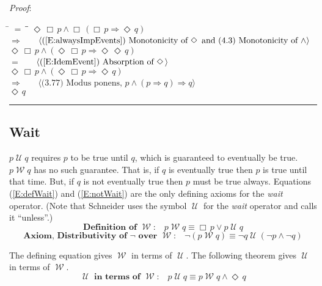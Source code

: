 \documentclass[12pt, fleqn, leqno]{article}
\newcommand{\lgap}{2pt}                             %
\newcommand{\mymathindent}{24pt}                    %
\newcommand{\impl}{\ensuremath{\Rightarrow}}        %
\newcommand{\Until}{\;\mathcal{U}\;}
\newcommand{\Wait}{\;\mathcal{W}\;}
\newcommand{\Event}{\Diamond\,}
\newcommand{\Always}{\Box\,}
\newcommand{\myqed}{\rule[-.23ex]{1.2ex}{2.0ex}}
\newcommand{\myqedtab}{\hspace{384pt}}              %
\newcommand{\Gll} {\langle}                         %
\newcommand{\Ggg} {\rangle}                         %
\newcommand{\Hint}[1]     {\ \ \ $\Gll              \mbox{#1} \Ggg$ }   %
\begin{document}
\emph{Proof}:
\begin{tabbing}
\hspace{\mymathindent} \= $= \;$ \= \myqedtab \= \kill
\> \>   $\Event\Always p \land \Always(\Always p \impl \Event q)$\\[\lgap]
\> $\impl$  \>  \Hint{(\ref{E:alwaysImpEvents}) Monotonicity of $\Event$ and (4.3) Monotonicity of $\land$}\\[\lgap]
\> \>   $\Event\Always p \land (\Event\Always p \impl \Event\Event q)$\\[\lgap]
\> $=$  \>  \Hint{(\ref{E:IdemEvent}) Absorption of $\Event$}\\[\lgap]
\> \>   $\Event\Always p \land (\Event\Always p \impl \Event q)$\\[\lgap]
\> $\impl$  \>  \Hint{(3.77) Modus ponens, $p\land (p\impl q)\impl q$}\\[\lgap]
\> \>   $\Event q$ \quad \myqed
\end{tabbing}

\subsection{Wait}\label{section-wait}

$p\Until q$ requires $p$ to be true until $q$, which is guaranteed to eventually be true.
$p\Wait q$ has no such guarantee.
That is, if $q$ is eventually true then $p$ is true until that time.
But, if $q$ is not eventually true then $p$ must be true always.
Equations (\ref{E:defWait}) and (\ref{E:notWait}) are the only defining axioms for the \textit{wait} operator.
(Note that Schneider \cite{Schn} uses the symbol $\Until$ for the \textit{wait} operator and calls it ``unless''.)
\begin{equation}\label{E:defWait}
\textbf{Definition of $\Wait$:}\quad p \Wait q \equiv \Always p \lor p \Until q 
\end{equation}
\begin{equation}\label{E:notWait}
\textbf{Axiom, Distributivity of $\neg$ over $\Wait$:}\quad \neg (p \Wait q) \equiv \neg q \Until (\neg p \land \neg q)
\end{equation}



The defining equation gives $\Wait$ in terms of $\Until$. The following theorem gives $\Until$ in terms of $\Wait$.
\begin{equation}\label{E:untilFromWait}
\textbf{$\Until$ in terms of $\Wait$:}\quad p \Until q \equiv p \Wait q\land \Event q
\end{equation}
\end{document}
